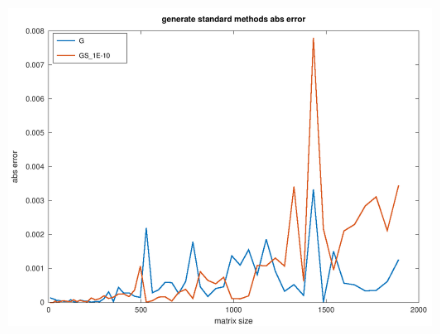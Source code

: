 \documentclass[10pt]{article}
\begin{document}
\begin{figure}[h]
\includegraphics[scale=0.45]{plots/06_gen_abs_error_standard_methods.png}
\end{figure}
\end{document}
